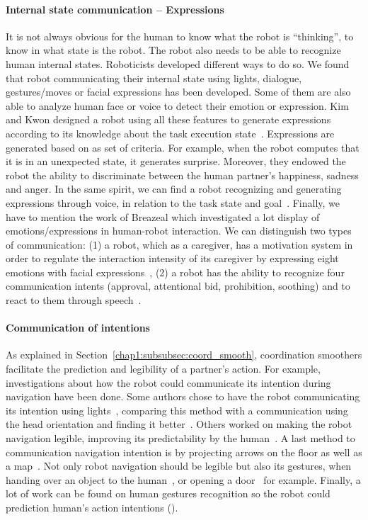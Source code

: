\documentclass[a4paper,11pt,twoside]{StyleThese}
\begin{document}
\paragraph{Internal state communication -- Expressions}
It is not always obvious for the human to know what the robot is ``thinking'', \ie to know in what state is the robot. The robot also needs to be able to recognize human internal states. Roboticists developed different ways to do so. We found that robot communicating their internal state using lights, dialogue, gestures/moves or facial expressions has been developed. Some of them are also able to analyze human face or voice to detect their emotion or expression. Kim and Kwon designed a robot using all these features to generate expressions according to its knowledge about the task execution state~\cite{kim_2010_computational}. Expressions are generated based on as set of criteria. For example, when the robot computes that it is in an unexpected state, it generates surprise. Moreover, they endowed the robot the ability to discriminate between the human partner's happiness, sadness and anger. In the same spirit, we can find a robot recognizing and generating expressions through voice, in relation to the task state and goal~\cite{scheutz_2006_utility}. Finally, we have to mention the work of Breazeal which investigated a lot display of emotions/expressions in human-robot interaction. We can distinguish two types of communication: (1) a robot, which as a caregiver, has a motivation system in order to regulate the interaction intensity of its caregiver by expressing eight emotions with facial expressions~\cite{breazeal_1998_motivational, breazeal_2004_function}, (2) a robot has the ability to recognize four communication intents (approval, attentional bid, prohibition, soothing) and to react to them through speech~\cite{breazeal_2002_regulation, breazeal_2003_emotion}.

\paragraph{Communication of intentions} As explained in Section~\ref{chap1:subsubsec:coord_smooth}, coordination smoothers facilitate the prediction and legibility of a partner's action. For example, investigations about how the robot could communicate its intention during navigation have been done. Some authors chose to have the robot communicating its intention using lights~\cite{szafir_2015_communicating}, comparing this method with a communication using the head orientation and finding it better~\cite{may_2015_show}. Others worked on making the robot navigation legible, improving its predictability by the human~\cite{dragan_2013_legibility, alami_2006_toward}. A last method to communication navigation intention is by projecting arrows on the floor as well as a map~\cite{chadalavada_2015_mind, coovert_2014_spatial}.  Not only robot navigation should be legible but also its gestures, when handing over an object to the human~\cite{sisbot_2012_human}, or opening a door~\cite{takayama_2011_expressing} for example. Finally, a lot of work can be found on human gestures recognition so the robot could prediction human's action intentions (\eg\cite{barros_2017_dynamic, chang_2018_effects}).
\end{document}
